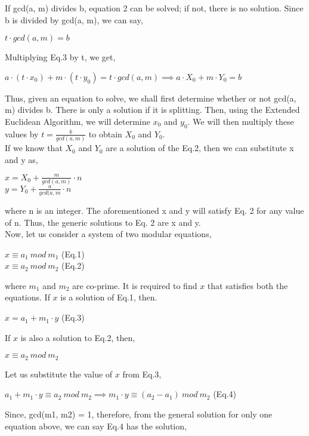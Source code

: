 \documentclass[11pt]{article}
\begin{document}
If gcd(a, m) divides b, equation 2 can be solved; if not, there is no solution. Since b is divided by gcd(a, m), we can say,
\begin{center}
    $t \cdot gcd(a, m) = b$
\end{center}
Multiplying Eq.3 by t, we get, 
\begin{center}
    $a \cdot (t \cdot x_0) + m \cdot (t\cdot y_0) = t \cdot gcd(a, m) \implies a \cdot  X_0 + m \cdot Y_0 = b$
\end{center}

Thus, given an equation to solve, we shall first determine whether or not gcd(a, m) divides b. There is only a solution if it is splitting. Then, using the Extended Euclidean Algorithm, we will determine $x_0$ and $y_0$. We will then multiply these values by $t = \frac{b}{gcd(a, m)}$ to obtain $X_0$ and $Y_0$.\\
\newpage
If we know that $X_0$ and $Y_0$ are a solution of the Eq.2, then we can substitute x and y as, 
\begin{center}
    $x = X_0 + \frac{m}{gcd(a, m)} \cdot n$\\
    \vspace{1mm}
    $y = Y_0 + \frac{a}{gcd(a, m} \cdot n$
\end{center}
where n is an integer. The aforementioned x and y will satisfy Eq. 2 for any value of n. Thus, the generic solutions to Eq. 2 are x and y.\\
\newline
Now, let us consider a system of two modular equations,
\begin{center}
    $x \equiv a_1 \ mod \ m_1$   (Eq.1)\\
    $x \equiv a_2 \ mod \ m_2$   (Eq.2)  
\end{center}
where $m_1$ and $m_2$ are co-prime. It is required to find $x$ that satisfies both the equations. If $x$ is a solution of Eq.1, then.
\begin{center}
    $x = a_1 + m_1 \cdot y$  (Eq.3)
\end{center}
If $x$ is also a solution to Eq.2, then,
\begin{center}
    $x \equiv a_2 \ mod \ m_2$
\end{center}
Let us substitute the value of $x$ from Eq.3,
\begin{center}
    $a_1 + m_1 \cdot y \equiv a_2 \ mod \ m_2 \implies m_1 \cdot y \equiv (a_2 - a_1) \ mod \ m_2$   (Eq.4)
\end{center}
Since, gcd(m1, m2) = 1, therefore, from the general solution for only one equation above, we can say Eq.4 has the solution,
\end{document}
